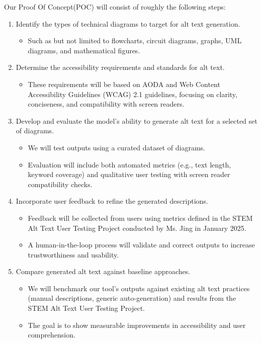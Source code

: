 \documentclass{article}
\begin{document}
Our Proof Of Concept(POC) will consist of roughly the following steps:
\begin{enumerate}
    \item Identify the types of technical diagrams to target for alt text generation.
    \begin{itemize}
        \item Such as but not limited to flowcharts, circuit diagrams, graphs, UML diagrams, and mathematical figures.
    \end{itemize}

    \item Determine the accessibility requirements and standards for alt text.
    \begin{itemize}
        \item These requirements will be based on AODA and Web Content Accessibility Guidelines (WCAG) 2.1 guidelines, focusing on clarity, conciseness, and compatibility with screen readers.
    \end{itemize}

    \item Develop and evaluate the model’s ability to generate alt text for a selected set of diagrams.
    \begin{itemize}
        \item We will test outputs using a curated dataset of diagrams.
        \item Evaluation will include both automated metrics (e.g., text length, keyword coverage) and qualitative user testing with screen reader compatibility checks.
    \end{itemize}

    \item Incorporate user feedback to refine the generated descriptions.
    \begin{itemize}
        \item Feedback will be collected from users using metrics defined in the STEM Alt Text User Testing Project conducted by Ms. Jing in January 2025.
        \item A human-in-the-loop process will validate and correct outputs to increase trustworthiness and usability.
    \end{itemize}

    \item Compare generated alt text against baseline approaches.
    \begin{itemize}
        \item We will benchmark our tool’s outputs against existing alt text practices (manual descriptions, generic auto-generation) and results from the STEM Alt Text User Testing Project.
        \item The goal is to show measurable improvements in accessibility and user comprehension.
    \end{itemize}


\end{enumerate}
\end{document}
